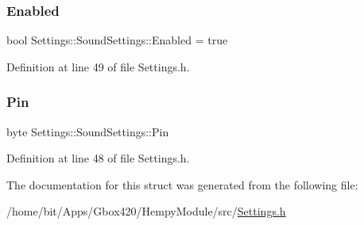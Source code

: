 \subsubsection{\texorpdfstring{Enabled}{Enabled}}
{\footnotesize\ttfamily bool Settings\+::\+Sound\+Settings\+::\+Enabled = true}



Definition at line 49 of file Settings.\+h.

\mbox{\label{struct_settings_1_1_sound_settings_a64d5653b63e3a0e0b532d5b9da807d5f}} 
\subsubsection{\texorpdfstring{Pin}{Pin}}
{\footnotesize\ttfamily byte Settings\+::\+Sound\+Settings\+::\+Pin}



Definition at line 48 of file Settings.\+h.



The documentation for this struct was generated from the following file\+:\begin{DoxyCompactItemize}
\item 
/home/bit/\+Apps/\+Gbox420/\+Hempy\+Module/src/\hyperlink{_hempy_module_2src_2_settings_8h}{Settings.\+h}\end{DoxyCompactItemize}
